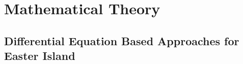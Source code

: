 
\chapter{Mathematical Theory}\label{chapter:Theory}
\FloatBarrier
\section{Differential Equation Based Approaches for Easter Island}

